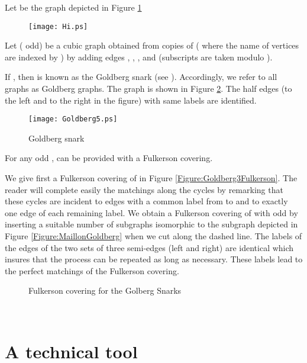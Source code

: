 \documentclass{amsart}
\theoremstyle{definition}
\theoremstyle{remark}
\newenvironment{prf}{{\bf \noindent Proof } }{\hfill\\}
\begin{document}
Let  be the graph depicted in Figure \ref{Figure:Hi}

\begin{figure}
\texttt{[image: Hi.ps]}
\caption{} \label{Figure:Hi}
\end{figure}


Let  ( odd) be a cubic graph obtained from  copies of
 ( where the name of vertices are indexed
by ) by adding edges  , ,
,  and  (subscripts are
taken modulo ).

If , then  is known as the Goldberg snark (see
\cite{Gol81}). Accordingly, we refer to all graphs  as Goldberg
graphs. The graph  is shown in Figure \ref{Figure:Goldberg5}.
The half edges (to the left and to the right in the figure) with
same labels are identified.


\begin{figure}
\centering 
\texttt{[image: Goldberg5.ps]}
\caption{Goldberg snark } \label{Figure:Goldberg5}
\end{figure}

\begin{thm}  \label{Theorem:GoldbergSnark} For any odd ,  can be
provided with a Fulkerson covering.
\end{thm}
\begin{prf}
We give first a Fulkerson covering of  in Figure
\ref{Figure:Goldberg3Fulkerson}. The reader will complete easily the
matchings along the cycles by remarking that these cycles are
incident to  edges with a common label from  to  and to
exactly one edge of each remaining label. We obtain a Fulkerson
covering of  with odd  by inserting a suitable
number of subgraphs isomorphic to the subgraph depicted in Figure
\ref{Figure:MaillonGoldberg} when we cut  along the dashed
line. The labels of the edges of the two sets of three semi-edges
(left and right) are identical which insures that the process can be
repeated as long as necessary. These labels lead to the perfect
matchings of the Fulkerson covering.
\begin{figure}
\centering 
{}
\caption{Fulkerson covering for the Golberg Snarks}
\end{figure}
\end{prf}


\section{A technical tool}
\end{document}
